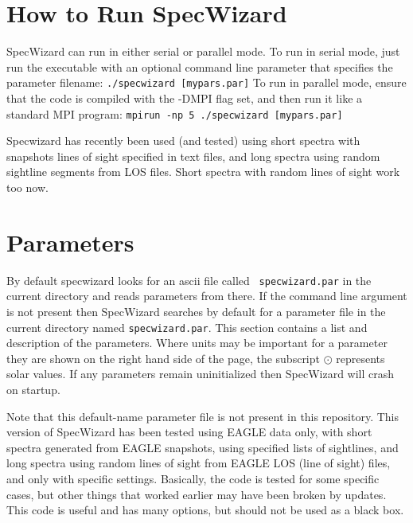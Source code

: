 \documentclass{report}
\begin{document}
\chapter{How to Run SpecWizard}

SpecWizard can run in either serial or parallel mode.  To run in serial mode, just run the executable with an optional command line parameter that specifies the parameter filename:
\linebreak\linebreak
{\tt ./specwizard [mypars.par]}
\linebreak\linebreak
To run in parallel mode, ensure that the code is compiled with the -DMPI flag set, and then run it like a standard MPI program:
\linebreak\linebreak
{\tt mpirun -np 5 ./specwizard [mypars.par]}
\linebreak\linebreak

Specwizard has recently been used (and tested) using short spectra with snapshots lines of sight specified in text files, and long spectra using random sightline segments from LOS files. Short spectra with random lines of sight work too now.

\chapter{Parameters}

By default specwizard looks for an ascii file called {\tt
  specwizard.par} in the current directory and reads parameters from
there.  If the command line argument is not present then SpecWizard
searches by default for a parameter file in the current directory
named {\tt specwizard.par}.  This section contains a %
list and description of the parameters.  Where units may be important for a
parameter they are shown on the right hand side of the page, the
subscript ${\odot}$ represents solar values.  If any parameters remain
uninitialized then SpecWizard will crash on startup.  \linebreak

Note that this default-name parameter file is not present in this repository. This version of SpecWizard has been tested using EAGLE data only, with short spectra generated from EAGLE snapshots, using specified lists of sightlines, and long spectra using random lines of sight from EAGLE LOS (line of sight) files, and only with specific settings. Basically, the code is tested for some specific cases, but other things that worked earlier may have been broken by updates. This code is useful and has many options, but should not be used as a black box. 
\end{document}
